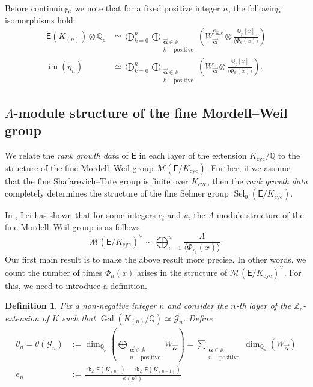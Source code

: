\documentclass{amsart}
\newtheorem{definition}[theorem]{Definition}
\numberwithin{equation}{section}
\theoremstyle{remark}
\newcommand{\val}{\vec{\boldsymbol{\alpha}}}
\newcommand{\rk}{\operatorname{rk}}
\newcommand{\EC}{\mathsf{E}}
\newcommand{\cG}{\mathcal{G}}
\newcommand{\cM}{\mathcal{M}}
\newcommand{\Gal}{\operatorname{Gal}}
\newcommand{\Qp}{\mathbb{Q}_p}
\newcommand{\Zp}{\mathbb{Z}_p}
\newcommand{\Z}{\mathbb{Z}}
\newcommand{\A}{\mathbb{A}}
\newcommand{\Q}{\mathbb{Q}}
\newcommand{\cyc}{\operatorname{{cyc}}}
\newcommand{\image}{\operatorname{im}}
\newcommand{\Sel}{\operatorname{Sel}}
\theoremstyle{plain} %
\begin{document}
Before continuing, we note that for a fixed positive integer $n$, the following isomorphisms hold:
\begin{align}
\label{1}
\EC(K_{(n)}) \otimes \Qp & \simeq \bigoplus_{k=0}^n \bigoplus_{\substack{\val\in \A\\ k-\text{positive}}} \left( W_{\val}^{e_{\val,k}} \otimes \frac{\Qp[x]}{\langle \Phi_k(x)\rangle} \right)\\
\label{2}
\image(\eta_n) & \simeq \bigoplus_{k=0}^n \bigoplus_{\substack{\val\in \A\\ k-\text{positive}}} \left( W_{\val} \otimes \frac{\Qp[x]}{\langle \Phi_k(x)\rangle} \right).
\end{align}

\subsection{\texorpdfstring{$\Lambda$}{}-module structure of the fine Mordell--Weil group}
We relate the \emph{rank growth data} of $\EC$ in each layer of the extension $K_{\cyc}/\Q$ to the structure of the fine Mordell--Weil group $\cM(\EC/K_{\cyc})$.
Further, if we assume that the fine Shafarevich--Tate group is finite over $K_{\cyc}$, then the \emph{rank growth data} completely determines the structure of the fine Selmer group $\Sel_0(\EC/K_{\cyc})$.

In \cite[Theorem~3.3]{Lei23}, Lei has shown that for some integers $c_i$ and $u$, the $\Lambda$-module structure of the fine Mordell--Weil group is as follows
\[
\cM(\EC/K_{\cyc})^\vee \sim \bigoplus_{i=1}^{u} \frac{\Lambda}{\langle \Phi_{c_i}(x) \rangle}.
\]
Our first main result is to make the above result more precise.
In other words, we count the number of times $\Phi_n(x)$ arises in the structure of $\cM(\EC/K_{\cyc})^\vee$.
For this, we need to introduce a definition.

\begin{definition}
\label{theta n}
Fix a non-negative integer $n$ and consider the $n$-th layer of the $\Zp$-extension of $K$ such that $\Gal(K_{(n)}/\Q)\simeq \cG_n$.
Define
\begin{align*}
\theta_n = \theta(\cG_n) &:= \dim_{\Qp}\left( \bigoplus_{\substack{\val\in \A \\ n-\text{positive}}} W_{\val}\right) = \sum_{\substack{\val\in \A \\ n-\text{positive}}} \dim_{\Qp}(W_{\val})\\
e_n &:= 
\frac{\rk_{\Z}\EC(K_{(n)}) - \rk_{\Z}\EC(K_{(n-1)})}{\phi(p^n)}
\end{align*}
\end{definition}
\end{document}
